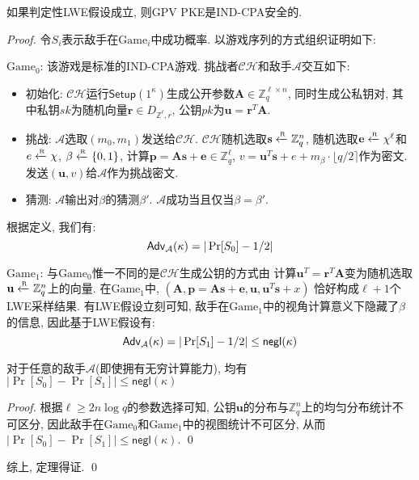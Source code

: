 \begin{theorem}
如果判定性LWE假设成立, 则GPV PKE是IND-CPA安全的. 
\end{theorem}

\begin{proof}
令$S_i$表示敌手在$\text{Game}_i$中成功概率. 以游戏序列的方式组织证明如下:
\begin{trivlist}
\item $\text{Game}_0$: 该游戏是标准的IND-CPA游戏. 
	挑战者$\mathcal{CH}$和敌手$\mathcal{A}$交互如下: 
	\begin{itemize}
		\item 初始化: $\mathcal{CH}$运行$\mathsf{Setup}(1^\kappa)$生成公开参数$\mathbf{A} \in \mathbb{Z}_q^{\ell \times n}$, 
			同时生成公私钥对, 其中私钥$sk$为随机向量$\mathbf{r} \in D_{\mathbb{Z}^\ell, r}$, 
			公钥$pk$为$\mathbf{u} = \mathbf{r}^T\mathbf{A}$.  

		\item 挑战: $\mathcal{A}$选取$(m_0, m_1)$发送给$\mathcal{CH}$. 
			$\mathcal{CH}$随机选取$\mathbf{s} \xleftarrow{\textup{\tiny R}} \mathbb{Z}_q^n$, 
			随机选取$\mathbf{e} \xleftarrow{\textup{\tiny R}} \chi^\ell$和$e \xleftarrow{\textup{\tiny R}} \chi$, $\beta \xleftarrow{\textup{\tiny R}} \{0,1\}$,  
			计算$\mathbf{p} = \mathbf{A}\mathbf{s}+\mathbf{e} \in \mathbb{Z}_q^\ell$, 
			$v = \mathbf{u}^T \mathbf{s} + e + m_\beta \cdot \lfloor q/2 \rceil$作为密文. 
			发送$(\mathbf{u}, v)$给$\mathcal{A}$作为挑战密文. 

		\item 猜测: $\mathcal{A}$输出对$\beta$的猜测$\beta'$. $\mathcal{A}$成功当且仅当$\beta = \beta'$. 
	\end{itemize} 
根据定义, 我们有: 
\begin{equation*}
\mathsf{Adv}_\mathcal{A}(\kappa) = |\Pr[S_0] - 1/2|
\end{equation*}  

\item $\text{Game}_1$: 与$\text{Game}_0$惟一不同的是$\mathcal{CH}$生成公钥的方式由
	计算$\mathbf{u}^T = \mathbf{r}^T \mathbf{A}$变为随机选取$\mathbf{u} \xleftarrow{\textup{\tiny R}} \mathbb{Z}_q^n$上的向量. 
	在$\text{Game}_1$中, $(\mathbf{A}, \mathbf{p} = \mathbf{A}\mathbf{s}+\mathbf{e}, \mathbf{u}, \mathbf{u}^T\mathbf{s}+x)$
	恰好构成$\ell+1$个LWE采样结果. 有LWE假设立刻可知, 敌手在$\text{Game}_1$中的视角计算意义下隐藏了$\beta$的信息, 
	因此基于LWE假设有: 
\begin{equation*}
\mathsf{Adv}_\mathcal{A}(\kappa) = |\Pr[S_1] - 1/2| \leq \mathsf{negl}(\kappa)
\end{equation*}
\end{trivlist} 

\begin{claim}
对于任意的敌手$\mathcal{A}$(即使拥有无穷计算能力), 均有$|\Pr[S_0] - \Pr[S_1]| \leq \mathsf{negl}(\kappa)$ 
\end{claim}

\begin{proof}
根据$\ell \geq 2n \log q$的参数选择可知, 公钥$\mathbf{u}$的分布与$\mathbb{Z}_q^n$上的均匀分布统计不可区分, 
因此敌手在$\text{Game}_0$和$\text{Game}_1$中的视图统计不可区分, 
从而$|\Pr[S_0] - \Pr[S_1]| \leq \mathsf{negl}(\kappa)$. \qed
\end{proof}

综上, 定理得证. \qed
\end{proof}

